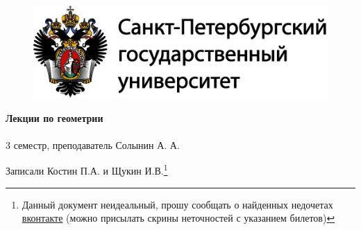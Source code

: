 \documentclass[main]{subfiles}
\begin{document}
	\begin{figure}[H]
			\includegraphics[width=12cm]{../../../template/spsu.jpg}
			\centering
	\end{figure}
	\vspace*{\fill}
	\begin{center}
		\huge \textbf{Лекции по геометрии}\\ \ \\
		\Large 3 семестр, преподаватель Солынин А. А.

		\large Записали Костин П.А. и Щукин И.В.\footnote{Данный документ неидеальный, прошу сообщать о найденных недочетах \href{https://vk.com/drab_existence_a}{вконтакте} (можно присылать скрины неточностей с указанием билетов)}
	\end{center}
	\vspace*{\fill}
	\vspace*{\fill}

	\newpage
	\tableofcontents
	\newpage
\end{document}
